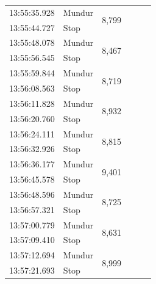 \begin{longtable}{|l|l|l|l|l|l|}
  \hline
  13:55:35.928           & Mundur                & \multirow{2}{*}{8,799}            \\
  \cline{1-2}
  13:55:44.727           & Stop                &             \\
  \hline
  13:55:48.078           & Mundur                & \multirow{2}{*}{8,467}            \\
  \cline{1-2}
  13:55:56.545           & Stop                &            \\
  \hline
  13:55:59.844           & Mundur                & \multirow{2}{*}{8,719}           \\
  \cline{1-2}
  13:56:08.563           & Stop                &           \\
  \hline
  13:56:11.828           & Mundur                & \multirow{2}{*}{8,932}            \\
  \cline{1-2}
  13:56:20.760           & Stop                &             \\
  \hline
  13:56:24.111           & Mundur                & \multirow{2}{*}{8,815}            \\
  \cline{1-2}
  13:56:32.926           & Stop                &            \\
  \hline
  13:56:36.177           & Mundur                & \multirow{2}{*}{9,401}           \\
  \cline{1-2}
  13:56:45.578           & Stop                &            \\
  \hline
  13:56:48.596           & Mundur                & \multirow{2}{*}{8,725}           \\
  \cline{1-2}
  13:56:57.321           & Stop                &            \\
  \hline
  13:57:00.779           & Mundur                & \multirow{2}{*}{8,631}           \\
  \cline{1-2}
  13:57:09.410           & Stop                &            \\
\hline
13:57:12.694           & Mundur                & \multirow{2}{*}{8,999}            \\
\cline{1-2}
13:57:21.693           & Stop                &             \\
\hline
\end{longtable}



